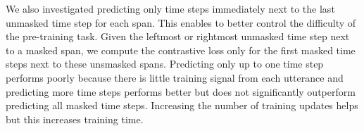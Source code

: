 \documentclass{article}
\begin{document}
We also investigated predicting only time steps immediately next to the last unmasked time step for each span. 
This enables to better control the difficulty of the pre-training task.
Given the leftmost or rightmost unmasked time step next to a masked span, we compute the contrastive loss only for the first  masked time steps next to these unsmasked spans.
Predicting only up to one time step performs poorly because there is little training signal from each utterance and predicting more time steps performs better but does not significantly outperform predicting all masked time steps.
Increasing the number of training updates helps but this increases training time.
\end{document}

